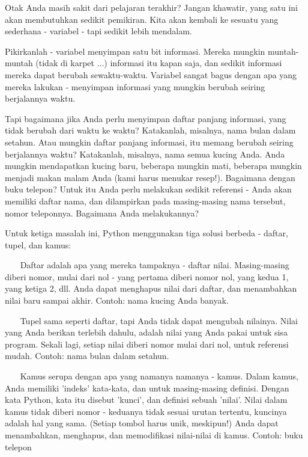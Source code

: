 Otak Anda masih sakit dari pelajaran terakhir? Jangan khawatir, yang satu ini akan membutuhkan sedikit pemikiran. Kita akan kembali ke sesuatu yang sederhana - variabel - tapi sedikit lebih mendalam. \par
\vspace{12pt}
Pikirkanlah - variabel menyimpan satu bit informasi. Mereka mungkin muntah-muntah (tidak di karpet ...) informasi itu kapan saja, dan sedikit informasi mereka dapat berubah sewaktu-waktu. Variabel sangat bagus dengan apa yang mereka lakukan - menyimpan informasi yang mungkin berubah seiring berjalannya waktu. \par
\vspace{12pt}
Tapi bagaimana jika Anda perlu menyimpan daftar panjang informasi, yang tidak berubah dari waktu ke waktu? Katakanlah, misalnya, nama bulan dalam setahun. Atau mungkin daftar panjang informasi, itu memang berubah seiring berjalannya waktu? Katakanlah, misalnya, nama semua kucing Anda. Anda mungkin mendapatkan kucing baru, beberapa mungkin mati, beberapa mungkin menjadi makan malam Anda (kami harus menukar resep!). Bagaimana dengan buku telepon? Untuk itu Anda perlu melakukan sedikit referensi - Anda akan memiliki daftar nama, dan dilampirkan pada masing-masing nama tersebut, nomor teleponnya. Bagaimana Anda melakukannya? \par
\vspace{12pt}
Untuk ketiga masalah ini, Python menggunakan tiga solusi berbeda - daftar, tupel, dan kamus: \par
\vspace{12pt}
~~~ Daftar adalah apa yang mereka tampaknya - daftar nilai. Masing-masing diberi nomor, mulai dari nol - yang pertama diberi nomor nol, yang kedua 1, yang ketiga 2, dll. Anda dapat menghapus nilai dari daftar, dan menambahkan nilai baru sampai akhir. Contoh: nama kucing Anda banyak. \par
~~~ Tupel sama seperti daftar, tapi Anda tidak dapat mengubah nilainya. Nilai yang Anda berikan terlebih dahulu, adalah nilai yang Anda pakai untuk sisa program. Sekali lagi, setiap nilai diberi nomor mulai dari nol, untuk referensi mudah. Contoh: nama bulan dalam setahun. \par
~~~ Kamus serupa dengan apa yang namanya namanya - kamus. Dalam kamus, Anda memiliki 'indeks' kata-kata, dan untuk masing-masing definisi. Dengan kata Python, kata itu disebut 'kunci', dan definisi sebuah 'nilai'. Nilai dalam kamus tidak diberi nomor - keduanya tidak sesuai urutan tertentu, kuncinya adalah hal yang sama. (Setiap tombol harus unik, meskipun!) Anda dapat menambahkan, menghapus, dan memodifikasi nilai-nilai di kamus. Contoh: buku telepon \par
